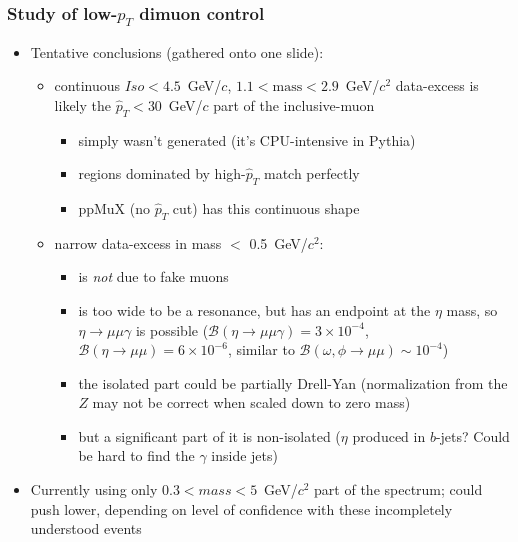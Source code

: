 \documentclass[compress]{beamer}
\begin{document}
\begin{frame}
\frametitle{Study of low-$p_T$ dimuon control}
\begin{itemize}
\item Tentative conclusions (gathered onto one slide):
\begin{itemize}
\item continuous $Iso < 4.5$~GeV/$c$, $1.1 < \mbox{mass} < 2.9$~GeV/$c^2$ data-excess is likely the $\hat{p}_T < 30$~GeV/$c$ part of the inclusive-muon
\begin{itemize}
\item simply wasn't generated (it's CPU-intensive in Pythia)
\item regions dominated by high-$\hat{p}_T$ match perfectly
\item ppMuX (no $\hat{p}_T$ cut) has this continuous shape
\end{itemize}
\item narrow data-excess in mass $<$ 0.5~GeV/$c^2$:
\begin{itemize}
\item is {\it not} due to fake muons
\item is too wide to be a resonance, but has an endpoint at the $\eta$ mass, so $\eta \to \mu\mu\gamma$ is possible ($\mathcal{B}(\eta \to \mu\mu\gamma) = 3\times 10^{-4}$, $\mathcal{B}(\eta \to \mu\mu) = 6\times 10^{-6}$, similar to $\mathcal{B}(\omega, \phi \to \mu\mu) \sim 10^{-4}$)
\item the isolated part could be partially Drell-Yan (normalization from the $Z$ may not be correct when scaled down to zero mass)
\item but a significant part of it is non-isolated ($\eta$ produced in $b$-jets?  Could be hard to find the $\gamma$ inside jets)
\end{itemize}
\end{itemize}

\item Currently using only $0.3 < mass < 5$~GeV/$c^2$ part of the
  spectrum; could push lower, depending on level of confidence with
  these incompletely understood events
\end{itemize}
\end{frame}
\end{document}
